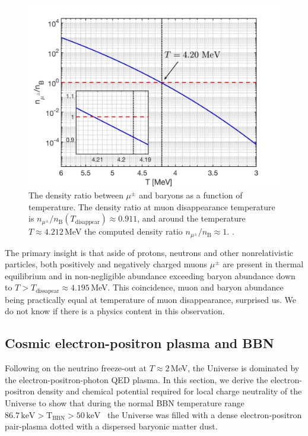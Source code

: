 \begin{figure}
\centerline{\includegraphics[width=0.9\linewidth]{./plots/DensityRatio_new2.jpg}}
\caption{The density ratio between $\mu^\pm$ and baryons as a function of temperature. The density ratio at muon disappearance temperature is $n_{\mu^\pm}/n_\mathrm{B}(T_\mathrm{disappear})\approx0.911$, and around the temperature $T\approx4.212$\,MeV the computed density ratio $n_{\mu^\pm}/n_\mathrm{B}\approx1$. . }
\label{fig:DensityRatio}
\end{figure}

The primary insight is that aside of protons, neutrons and other nonrelativistic particles, both positively and negatively charged muons $\mu^\pm$ are present in thermal equilibrium and in non-negligible abundance exceeding baryon abundance down to $T>T_\mathrm{dissapear}\approx 4.195$\,MeV. This coincidence, muon and baryon abundance being practically equal at temperature of muon disappearance, surprised us. We do not know if there is a physics content in this observation. 

\subsection{Cosmic electron-positron plasma and BBN}
\label{section:electron}
Following on the neutrino freeze-out at $T\approx 2$\,MeV, the Universe is dominated by the electron-positron-photon QED plasma. In this section, we derive the electron-positron density and chemical potential required for local charge neutrality of the Universe to show that during the normal BBN temperature range $86.7\,\mathrm{keV}>\mathrm{T_{BBN}}>50\,\mathrm{keV}$~\cite{Pitrou:2018cgg} the Universe was filled with a dense electron-positron pair-plasma dotted with a dispersed baryonic matter dust. 

